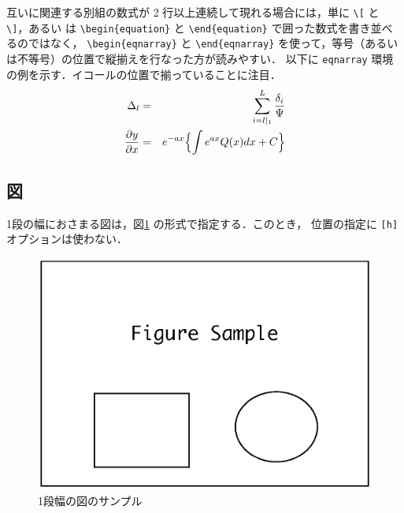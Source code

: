 \documentclass[a4j]{matsushita-zemi}
\begin{document}
互いに関連する別組の数式が 2 行以上連続して現れる場合には，単に
\verb|\[| と \verb|\]|，あるい は \verb|\begin{equation}|
と \verb|\end{equation}| で囲った数式を書き並べるのではなく，
\verb|\begin|\allowbreak\verb|{eqnarray}| と \verb|\end{eqnarray}| 
を使って，等号（あるいは不等号）の位置で縦揃えを行なった方が読みやすい．
以下に \verb|eqnarray| 環境の例を示す．イコールの位置で揃っていることに注目．
%
\begin{eqnarray}
\Delta_l &=& \sum_{i=l|_1}^L\frac{\delta_{i}}{\Psi }\\
\frac{\partial y}{\partial x} &=& e^{-ax} \Bigl\{ \int e^{ax} Q(x)dx + C\Bigl\}
\end{eqnarray}
%

\newpage
\subsection{図}

1段の幅におさまる図は，図\ref{fig:single} の形式で指定する．このとき，
位置の指定に \verb|[h]| オプションは使わない．

\begin{figure}[tb]
  \centering\includegraphics[clip, width=.95\columnwidth]{figureSample.eps}
  \caption{1段幅の図のサンプル}
  \label{fig:single}
\end{figure}
\end{document}

